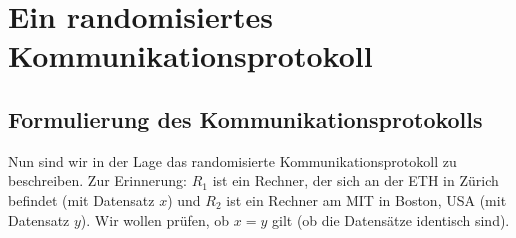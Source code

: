 %


\clearpage
\section{Ein randomisiertes Kommunikationsprotokoll}

\subsection{Formulierung des Kommunikationsprotokolls}
Nun sind wir in der Lage das randomisierte Kommunikationsprotokoll zu beschreiben.
Zur Erinnerung: $R_1$ ist ein Rechner, der sich an der ETH in Zürich befindet (mit Datensatz $x$) und $R_2$ ist ein Rechner am MIT in Boston, USA (mit Datensatz $y$).
Wir wollen prüfen, ob $x = y$ gilt (ob die Datensätze identisch sind).

